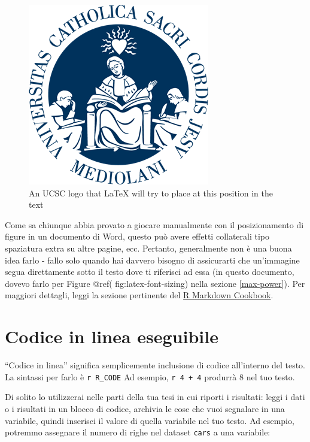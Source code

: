 \documentclass[a4paper, 11pt, nobind]{templates/ociamthesis}
\begin{document}
\begin{figure}[H]

{\centering \includegraphics[width=0.5\linewidth]{figures/sample-content/cattolica-logo} 

}

\caption{An UCSC logo that LaTeX will try to place at this position in the text}\label{fig:cattolica-logo-controlled}
\end{figure}

Come sa chiunque abbia provato a giocare manualmente con il posizionamento di figure in un documento di Word, questo può avere effetti collaterali tipo spaziatura extra su altre pagine, ecc.
Pertanto, generalmente non è una buona idea farlo - fallo solo quando hai davvero bisogno di assicurarti che un'immagine segua direttamente sotto il testo dove ti riferisci ad essa (in questo documento, dovevo farlo per Figure @ref( fig:latex-font-sizing) nella sezione \ref{max-power}).
Per maggiori dettagli, leggi la sezione pertinente del \href{https://bookdown.org/yihui/rmarkdown-cookbook/figure-placement.html}{R Markdown Cookbook}.

\hypertarget{codice-in-linea-eseguibile}{%
\section{Codice in linea eseguibile}\label{codice-in-linea-eseguibile}}

``Codice in linea'' significa semplicemente inclusione di codice all'interno del testo.
La sintassi per farlo è \texttt{\textasciigrave{}r\ R\_CODE\textasciigrave{}}
Ad esempio, \texttt{\textasciigrave{}r\ 4\ +\ 4\textasciigrave{}} produrrà 8 nel tuo testo.

Di solito lo utilizzerai nelle parti della tua tesi in cui riporti i risultati: leggi i dati o i risultati in un blocco di codice, archivia le cose che vuoi segnalare in una variabile, quindi inserisci il valore di quella variabile nel tuo testo.
Ad esempio, potremmo assegnare il numero di righe nel dataset \texttt{cars} a una variabile:
\end{document}
